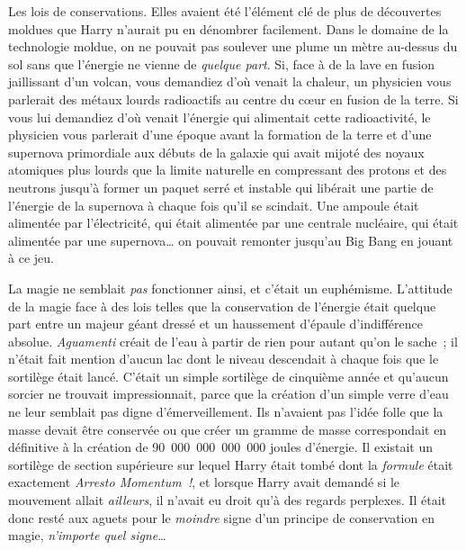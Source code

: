Les lois de conservations. Elles avaient été l'élément clé de plus de découvertes moldues que Harry n'aurait pu en dénombrer facilement. Dans le domaine de la technologie moldue, on ne pouvait pas soulever une plume un mètre au-dessus du sol sans que l'énergie ne vienne de \emph{quelque part}. Si, face à de la lave en fusion jaillissant d'un volcan, vous demandiez d'où venait la chaleur, un physicien vous parlerait des métaux lourds radioactifs au centre du cœur en fusion de la terre. Si vous lui demandiez d'où venait l'énergie qui alimentait cette radioactivité, le physicien vous parlerait d'une époque avant la formation de la terre et d'une supernova primordiale aux débuts de la galaxie qui avait mijoté des noyaux atomiques plus lourds que la limite naturelle en compressant des protons et des neutrons jusqu'à former un paquet serré et instable qui libérait une partie de l'énergie de la supernova à chaque fois qu'il se scindait. Une ampoule était alimentée par l'électricité, qui était alimentée par une centrale nucléaire, qui était alimentée par une supernova… on pouvait remonter jusqu'au Big Bang en jouant à ce jeu.

La magie ne semblait \emph{pas} fonctionner ainsi, et c'était un euphémisme. L'attitude de la magie face à des lois telles que la conservation de l'énergie était quelque part entre un majeur géant dressé et un haussement d'épaule d'indifférence absolue. \emph{Aguamenti} créait de l'eau à partir de rien pour autant qu'on le sache~; il n'était fait mention d'aucun lac dont le niveau descendait à chaque fois que le sortilège était lancé. C'était un simple sortilège de cinquième année et qu'aucun sorcier ne trouvait impressionnait, parce que la création d'un simple verre d'eau ne leur semblait pas digne d'émerveillement. Ils n'avaient pas l'idée folle que la masse devait être conservée ou que créer un gramme de masse correspondait en définitive à la création de 90~000~000~000~000 joules d'énergie. Il existait un sortilège de section supérieure sur lequel Harry était tombé dont la \emph{formule} était exactement \emph{Arresto Momentum~!}, et lorsque Harry avait demandé si le mouvement allait \emph{ailleurs}, il n'avait eu droit qu'à des regards perplexes. Il était donc resté aux aguets pour le \emph{moindre} signe d'un principe de conservation en magie, \emph{n'importe quel signe}…

